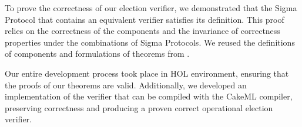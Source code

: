 To prove the correctness of our election verifier, we demonstrated that the Sigma Protocol that contains an equivalent verifier satisfies its definition. This proof relies on the correctness of the components and the invariance of correctness properties under the combinations of Sigma Protocols. We reused the definitions of components and formulations of theorems from \cite{Haines2019VerifiedVF, Haines2021DidYM}.

Our entire development process took place in HOL environment, ensuring that the proofs of our theorems are valid. Additionally, we developed an implementation of the verifier that can be compiled with the CakeML compiler, preserving correctness and producing a proven correct operational election verifier.





